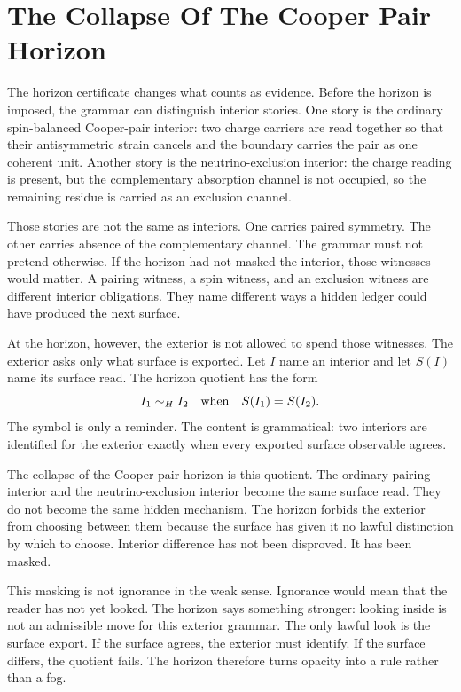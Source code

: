 \section{The Collapse Of The Cooper Pair Horizon}

The horizon certificate changes what counts as evidence. Before the horizon
is imposed, the grammar can distinguish interior stories. One story is the
ordinary spin-balanced Cooper-pair interior: two charge carriers are read
together so that their antisymmetric strain cancels and the boundary carries
the pair as one coherent unit. Another story is the neutrino-exclusion
interior: the charge reading is present, but the complementary absorption
channel is not occupied, so the remaining residue is carried as an exclusion
channel.

Those stories are not the same as interiors. One carries paired symmetry.
The other carries absence of the complementary channel. The grammar must not
pretend otherwise. If the horizon had not masked the interior, those
witnesses would matter. A pairing witness, a spin witness, and an exclusion
witness are different interior obligations. They name different ways a
hidden ledger could have produced the next surface.

At the horizon, however, the exterior is not allowed to spend those
witnesses. The exterior asks only what surface is exported. Let \(I\) name
an interior and let \(S(I)\) name its surface read. The horizon quotient has
the form
\[
  I_1 \sim_H I_2
  \quad\hbox{when}\quad
  S(I_1)=S(I_2).
\]
The symbol is only a reminder. The content is grammatical: two interiors are
identified for the exterior exactly when every exported surface observable
agrees.

The collapse of the Cooper-pair horizon is this quotient. The ordinary
pairing interior and the neutrino-exclusion interior become the same
surface read. They do not become the same hidden mechanism. The horizon
forbids the exterior from choosing between them because the surface has
given it no lawful distinction by which to choose. Interior difference has
not been disproved. It has been masked.

This masking is not ignorance in the weak sense. Ignorance would mean that
the reader has not yet looked. The horizon says something stronger: looking
inside is not an admissible move for this exterior grammar. The only lawful
look is the surface export. If the surface agrees, the exterior must
identify. If the surface differs, the quotient fails. The horizon therefore
turns opacity into a rule rather than a fog.

